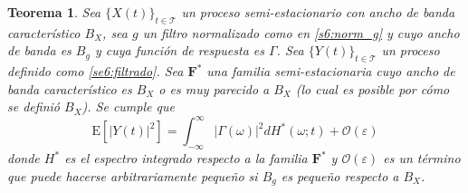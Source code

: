 \documentclass[12pt,letterpaper]{book}
\newtheorem{teorema}{Teorema}[chapter]
\newcommand{\intR}{\int_{-\infty}^{\infty}}
\newcommand{\ef}{\mathbf{F}}
\newcommand{\efstar}{\ef^{\boldsymbol{*}}}
\newcommand{\E}[1]{\mathrm{E}\left[ #1 \right]}
\newcommand{\abso}[1]{\left| #1 \right|}
\newcommand{\xt}{$\{X(t)\}_{t\in \mathcal{T}}$ }
\newcommand{\orden}[1]{\mathcal{O}\left( #1 \right)}
\begin{document}
\begin{teorema}
Sea \xt un proceso semi-estacionario con ancho de banda característico $B_X$, sea $g$ un filtro normalizado como en \ref{s6:norm_g} y cuyo ancho de banda es $B_g$ y cuya función de respuesta es $\Gamma$. 
%
Sea $\{Y(t)\}_{t\in \mathcal{T}}$ un proceso definido como \ref{se6:filtrado}.
%
Sea $\efstar$ una familia semi-estacionaria cuyo ancho de banda característico es $B_X$ o es muy parecido a $B_X$ (lo cual es posible por cómo se definió $B_X$).
%
Se cumple que
\begin{equation}
\E{\abso{Y(t)}^{2}} = \intR \abso{\Gamma(\omega)}^{2} dH^{*}(\omega; t) + \orden{\varepsilon}
\end{equation}
donde $H^{*}$ es el espectro integrado respecto a la familia $\efstar$ y $\orden{\varepsilon}$ es un término que puede hacerse arbitrariamente pequeño si $B_g$ es pequeño respecto a $B_X$.
\label{teo:aprox_orden}
\end{teorema}
\end{document}
